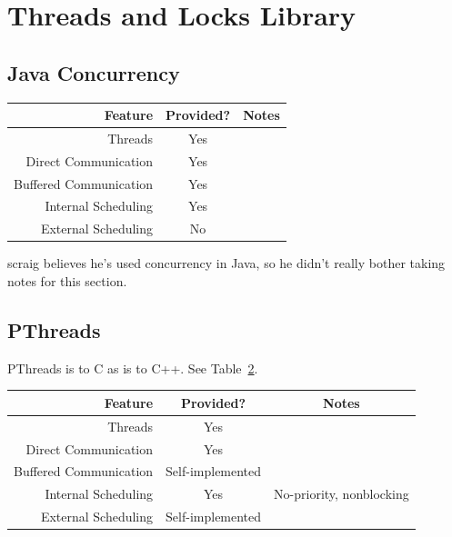         \section{Threads and Locks Library} %
        \label{sec:threads_and_locks_library}
            \subsection{Java Concurrency} %
            \label{sub:java_concurrency}
                \begin{table}[h]
                    \centering
                    \begin{tabular}{| r || c | c |}
                        \hline
                        Feature                 & Provided? & Notes \\ \hline \hline
                        Threads                 & Yes & \\ \hline
                        Direct Communication    & Yes & \\ \hline
                        Buffered Communication  & Yes & \\ \hline
                        Internal Scheduling     & Yes & \\ \hline
                        External Scheduling     & No & \\ \hline
                    \end{tabular}
                    \label{tbl:java}
                \end{table}
                scraig believes he's used concurrency in Java, so he didn't really bother taking notes for this section.
            \subsection{PThreads} %
            \label{sub:pthreads}
                PThreads is to C as \uC is to C++.
                See Table~\ref{tbl:pthreads}.
                \begin{table}[h]
                    \label{tbl:pthreads}
                    \centering
                    \begin{tabular}{| r || c | c |}
                        \hline
                        Feature                 & Provided? & Notes \\ \hline \hline
                        Threads                 & Yes & \\ \hline
                        Direct Communication    & Yes & \\ \hline
                        Buffered Communication  & Self-implemented & \\ \hline
                        Internal Scheduling     & Yes & No-priority, nonblocking \\ \hline
                        External Scheduling     & Self-implemented & \\ \hline
                    \end{tabular}
                \end{table}
